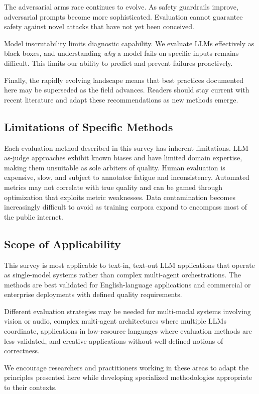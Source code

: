 The adversarial arms race continues to evolve. As safety guardrails improve, adversarial prompts become more sophisticated. Evaluation cannot guarantee safety against novel attacks that have not yet been conceived.

Model inscrutability limits diagnostic capability. We evaluate LLMs effectively as black boxes, and understanding \emph{why} a model fails on specific inputs remains difficult. This limits our ability to predict and prevent failures proactively.

Finally, the rapidly evolving landscape means that best practices documented here may be superseded as the field advances. Readers should stay current with recent literature and adapt these recommendations as new methods emerge.

\subsection{Limitations of Specific Methods}

Each evaluation method described in this survey has inherent limitations. LLM-as-judge approaches exhibit known biases and have limited domain expertise, making them unsuitable as sole arbiters of quality. Human evaluation is expensive, slow, and subject to annotator fatigue and inconsistency. Automated metrics may not correlate with true quality and can be gamed through optimization that exploits metric weaknesses. Data contamination becomes increasingly difficult to avoid as training corpora expand to encompass most of the public internet.

\subsection{Scope of Applicability}

This survey is most applicable to text-in, text-out LLM applications that operate as single-model systems rather than complex multi-agent orchestrations. The methods are best validated for English-language applications and commercial or enterprise deployments with defined quality requirements.

Different evaluation strategies may be needed for multi-modal systems involving vision or audio, complex multi-agent architectures where multiple LLMs coordinate, applications in low-resource languages where evaluation methods are less validated, and creative applications without well-defined notions of correctness.

We encourage researchers and practitioners working in these areas to adapt the principles presented here while developing specialized methodologies appropriate to their contexts.
